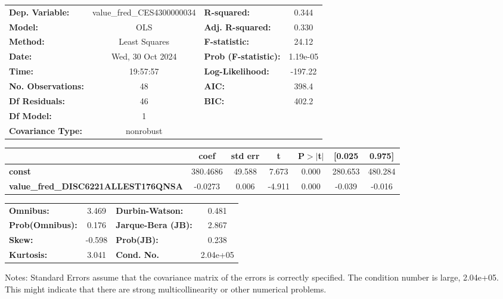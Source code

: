 \begin{center}
\begin{tabular}{lclc}
\toprule
\textbf{Dep. Variable:}                     & value\_fred\_CES4300000034 & \textbf{  R-squared:         } &     0.344   \\
\textbf{Model:}                             &            OLS             & \textbf{  Adj. R-squared:    } &     0.330   \\
\textbf{Method:}                            &       Least Squares        & \textbf{  F-statistic:       } &     24.12   \\
\textbf{Date:}                              &      Wed, 30 Oct 2024      & \textbf{  Prob (F-statistic):} &  1.19e-05   \\
\textbf{Time:}                              &          19:57:57          & \textbf{  Log-Likelihood:    } &   -197.22   \\
\textbf{No. Observations:}                  &               48           & \textbf{  AIC:               } &     398.4   \\
\textbf{Df Residuals:}                      &               46           & \textbf{  BIC:               } &     402.2   \\
\textbf{Df Model:}                          &                1           & \textbf{                     } &             \\
\textbf{Covariance Type:}                   &         nonrobust          & \textbf{                     } &             \\
\bottomrule
\end{tabular}
\begin{tabular}{lcccccc}
                                            & \textbf{coef} & \textbf{std err} & \textbf{t} & \textbf{P$> |$t$|$} & \textbf{[0.025} & \textbf{0.975]}  \\
\midrule
\textbf{const}                              &     380.4686  &       49.588     &     7.673  &         0.000        &      280.653    &      480.284     \\
\textbf{value\_fred\_DISC6221ALLEST176QNSA} &      -0.0273  &        0.006     &    -4.911  &         0.000        &       -0.039    &       -0.016     \\
\bottomrule
\end{tabular}
\begin{tabular}{lclc}
\textbf{Omnibus:}       &  3.469 & \textbf{  Durbin-Watson:     } &    0.481  \\
\textbf{Prob(Omnibus):} &  0.176 & \textbf{  Jarque-Bera (JB):  } &    2.867  \\
\textbf{Skew:}          & -0.598 & \textbf{  Prob(JB):          } &    0.238  \\
\textbf{Kurtosis:}      &  3.041 & \textbf{  Cond. No.          } & 2.04e+05  \\
\bottomrule
\end{tabular}
\end{center}

Notes: \newline
 [1] Standard Errors assume that the covariance matrix of the errors is correctly specified. \newline
 [2] The condition number is large, 2.04e+05. This might indicate that there are \newline
 strong multicollinearity or other numerical problems.